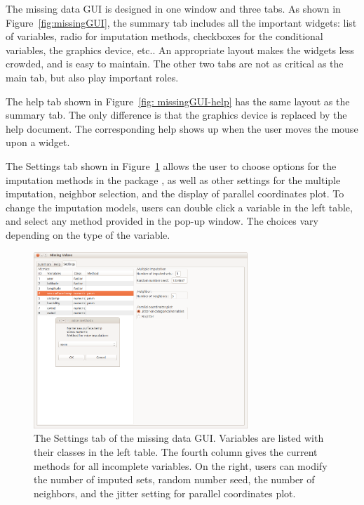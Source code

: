 \documentclass[article]{jss}
\begin{document}
The missing data GUI is designed in one window and three tabs. As shown in Figure~\ref{fig:missingGUI}, the summary tab includes all the important widgets: list of variables, radio for imputation methods, checkboxes for the conditional variables, the graphics device, etc.. An appropriate layout makes the widgets less crowded, and is easy to maintain. The other two tabs are not as critical as the main tab, but also play important roles.

The help tab shown in Figure~\ref{fig: missingGUI-help} has the same layout as the summary tab. The only difference is that the graphics device is replaced by the help document. The corresponding help shows up when the user moves the mouse upon a widget.

The Settings tab shown in Figure~\ref{fig: missingGUI-setting} allows 
the user to choose options for the imputation methods in the 
package , as well as other settings for the multiple 
imputation, neighbor selection, and the display of parallel 
coordinates plot. To change the imputation models, users can double click a 
variable in the left table, and select any method provided in the pop-up window. 
The choices vary depending on the type of the variable.

\begin{center}
\begin{figure}[h]
\begin{centering}
\includegraphics[width=0.72\textwidth]{graph/fig1-GUI-tab3}
\par\end{centering}
\caption{The Settings tab of the missing data GUI. Variables are listed with their classes in the left table. The fourth column gives the current  methods for all incomplete variables. On the right, users can modify the number of imputed sets, random number seed, the number of neighbors, and the jitter setting for parallel coordinates plot.}
\label{fig: missingGUI-setting}
\end{figure}
\par\end{center}
\end{document}
